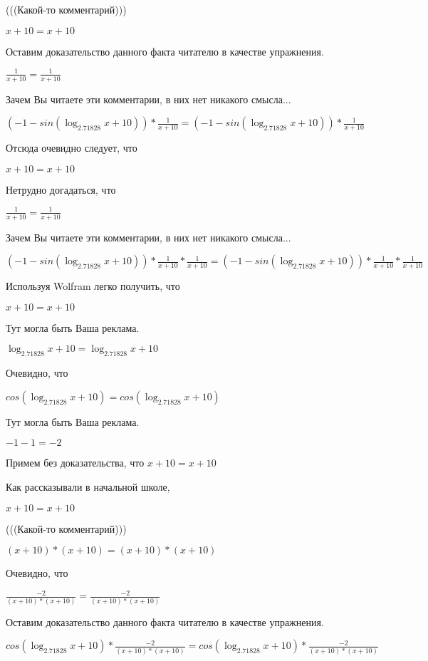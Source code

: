 \documentclass[12pt,a4paper,fleqn]{article}
\theoremstyle{definition}
\begin{document}
(((Какой-то комментарий)))

$ x  +  10  =  x  +  10 $

Оставим доказательство данного факта читателю в качестве упражнения.

$\frac{ 1 }{ x  +  10 }
 = \frac{ 1 }{ x  +  10 }
$

Зачем Вы читаете эти комментарии, в них нет никакого смысла...

$( -1  - sin(\log_{ 2.71828 }{ x  +  10 })) * \frac{ 1 }{ x  +  10 }
 = ( -1  - sin(\log_{ 2.71828 }{ x  +  10 })) * \frac{ 1 }{ x  +  10 }
$

Отсюда очевидно следует, что

$ x  +  10  =  x  +  10 $

Нетрудно догадаться, что

$\frac{ 1 }{ x  +  10 }
 = \frac{ 1 }{ x  +  10 }
$

Зачем Вы читаете эти комментарии, в них нет никакого смысла...

$( -1  - sin(\log_{ 2.71828 }{ x  +  10 })) * \frac{ 1 }{ x  +  10 }
 * \frac{ 1 }{ x  +  10 }
 = ( -1  - sin(\log_{ 2.71828 }{ x  +  10 })) * \frac{ 1 }{ x  +  10 }
 * \frac{ 1 }{ x  +  10 }
$

Используя Wolfram легко получить, что

$ x  +  10  =  x  +  10 $

Тут могла быть Ваша реклама.

$\log_{ 2.71828 }{ x  +  10 } = \log_{ 2.71828 }{ x  +  10 }$

Очевидно, что

$cos(\log_{ 2.71828 }{ x  +  10 }) = cos(\log_{ 2.71828 }{ x  +  10 })$

Тут могла быть Ваша реклама.

$ -1  -  1  =  -2 $

Примем без доказательства, что
$ x  +  10  =  x  +  10 $

Как рассказывали в начальной школе,

$ x  +  10  =  x  +  10 $

(((Какой-то комментарий)))

$( x  +  10 ) * ( x  +  10 ) = ( x  +  10 ) * ( x  +  10 )$

Очевидно, что

$\frac{ -2 }{( x  +  10 ) * ( x  +  10 )}
 = \frac{ -2 }{( x  +  10 ) * ( x  +  10 )}
$

Оставим доказательство данного факта читателю в качестве упражнения.

$cos(\log_{ 2.71828 }{ x  +  10 }) * \frac{ -2 }{( x  +  10 ) * ( x  +  10 )}
 = cos(\log_{ 2.71828 }{ x  +  10 }) * \frac{ -2 }{( x  +  10 ) * ( x  +  10 )}
$
\end{document}
